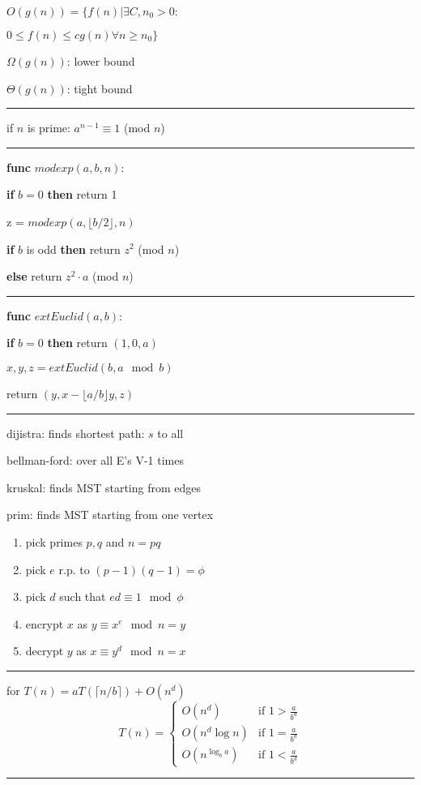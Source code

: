 \documentclass[10pt]{article}
\begin{document}
$O(g(n)) = \{f(n)|\exists C, n_0>0:$
\par
\hspace{10pt} $0 \le f(n)\le cg(n)\forall n \ge n_0\}$
\par
$\Omega(g(n))$: lower bound
\par
$\Theta(g(n))$: tight bound
\hrule

if $n$ is prime: $a^{n-1} \equiv 1$ (mod $n$)
\hrule

\textbf{func} $modexp(a,b,n)$:
\par
\textbf{if} $b=0$ \textbf{then} return 1
\par
z = $modexp(a,\lfloor b/2 \rfloor,n)$
\par
\textbf{if} $b$ is odd \textbf{then} return $z^2$ (mod $n$)
\par
\textbf{else} return $z^2 \cdot a$ (mod $n$)
\hrule

\textbf{func} $extEuclid(a,b)$:
\par
\hspace{10pt} \textbf{if} $b=0$ \textbf{then} return $(1,0,a)$
\par
$x,y,z = extEuclid(b,a \mod b)$
\par
\hspace{10pt} return $(y,x - \lfloor a/b \rfloor y,z)$
\hrule

dijistra: finds shortest path: $s$ to all
\par
bellman-ford: over all E's V-1 times
\par
kruskal: finds MST starting from edges
\par
prim: finds MST starting from one vertex

\vspace{.5cm}



\begin{enumerate}
    \item pick primes $p,q$ and $n=pq$
    \item pick $e$ r.p. to $(p-1)(q-1)= \phi$
    \item pick $d$ such that $ed \equiv 1 \mod \phi$
    \item encrypt $x$ as $y \equiv x^e \mod n = y$
    \item decrypt $y$ as $x \equiv y^d \mod n = x$
\end{enumerate}
\hrule

for $T(n) = aT(\lceil n/b \rceil) + O(n^d)$
\[
T(n) = 
\begin{cases}
O(n^d) & \text{if } 1 > \frac{a}{b^d} \\
O(n^d \log n) & \text{if } 1 = \frac{a}{b^d} \\
O(n^{\log_b a}) & \text{if } 1 < \frac{a}{b^d}
\end{cases}
\]
\hrule
\end{document}

